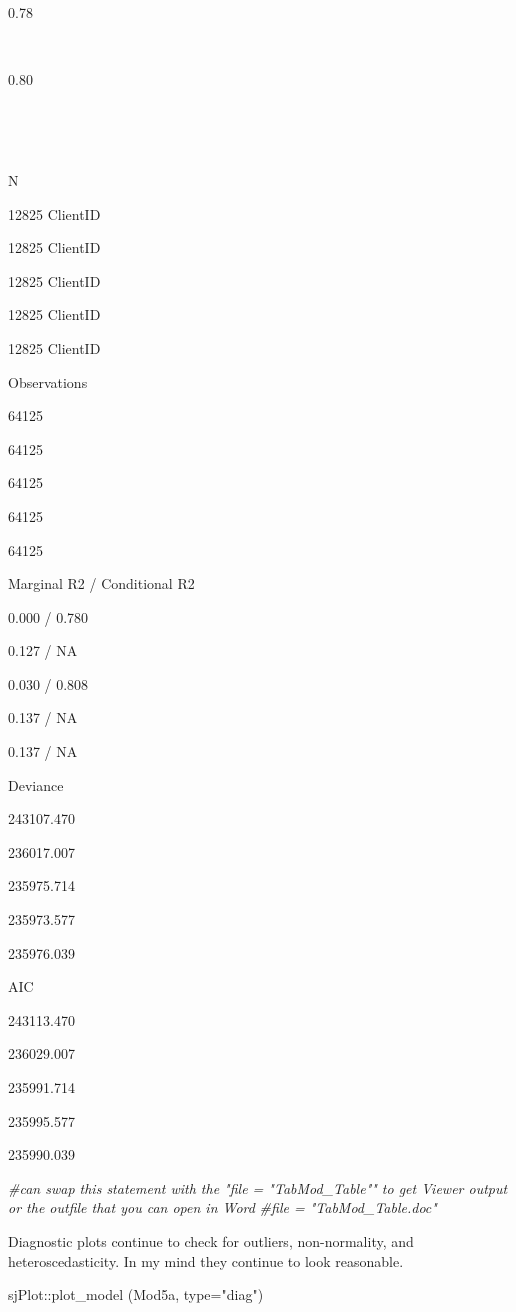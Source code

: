 \documentclass[
  11pt,
]{book}
\newenvironment{Shaded}{\begin{snugshade}}{\end{snugshade}}
\newcommand{\AttributeTok}[1]{\textcolor[rgb]{0.77,0.63,0.00}{#1}}
\newcommand{\CommentTok}[1]{\textcolor[rgb]{0.56,0.35,0.01}{\textit{#1}}}
\newcommand{\FunctionTok}[1]{\textcolor[rgb]{0.00,0.00,0.00}{#1}}
\newcommand{\NormalTok}[1]{#1}
\newcommand{\SpecialCharTok}[1]{\textcolor[rgb]{0.00,0.00,0.00}{#1}}
\newcommand{\StringTok}[1]{\textcolor[rgb]{0.31,0.60,0.02}{#1}}
\begin{document}
0.78

~

0.80

~

~

N

12825 ClientID

12825 ClientID

12825 ClientID

12825 ClientID

12825 ClientID

Observations

64125

64125

64125

64125

64125

Marginal R2 / Conditional R2

0.000 / 0.780

0.127 / NA

0.030 / 0.808

0.137 / NA

0.137 / NA

Deviance

243107.470

236017.007

235975.714

235973.577

235976.039

AIC

243113.470

236029.007

235991.714

235995.577

235990.039

\begin{Shaded}
\begin{Highlighting}[]
\CommentTok{\#can swap this statement with the "file = "TabMod\_Table"" to get Viewer output or the outfile that you can open in Word}
\CommentTok{\#file = "TabMod\_Table.doc"}
\end{Highlighting}
\end{Shaded}

Diagnostic plots continue to check for outliers, non-normality, and heteroscedasticity. In my mind they continue to look reasonable.

\begin{Shaded}
\begin{Highlighting}[]
\NormalTok{sjPlot}\SpecialCharTok{::}\FunctionTok{plot\_model}\NormalTok{ (Mod5a, }\AttributeTok{type=}\StringTok{"diag"}\NormalTok{)}
\end{Highlighting}
\end{Shaded}
\end{document}
